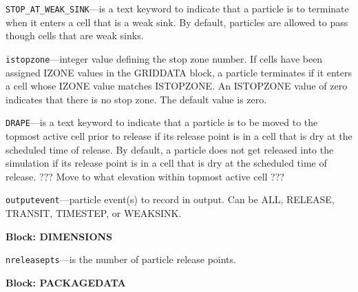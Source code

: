 \begin{description}
\item \texttt{STOP\_AT\_WEAK\_SINK}---is a text keyword to indicate that a particle is to terminate when it enters a cell that is a weak sink.  By default, particles are allowed to pass though cells that are weak sinks.

\item \texttt{istopzone}---integer value defining the stop zone number.  If cells have been assigned IZONE values in the GRIDDATA block, a particle terminates if it enters a cell whose IZONE value matches ISTOPZONE.  An ISTOPZONE value of zero indicates that there is no stop zone.  The default value is zero.

\item \texttt{DRAPE}---is a text keyword to indicate that a particle is to be moved to the topmost active cell prior to release if its release point is in a cell that is dry at the scheduled time of release.  By default, a particle does not get released into the simulation if its release point is in a cell that is dry at the scheduled time of release.  ??? Move to what elevation within topmost active cell ???

\item \texttt{outputevent}---particle event(s) to record in output.  Can be ALL, RELEASE, TRANSIT, TIMESTEP, or WEAKSINK.

\end{description}
\item \textbf{Block: DIMENSIONS}

\begin{description}
\item \texttt{nreleasepts}---is the number of particle release points.

\end{description}
\item \textbf{Block: PACKAGEDATA}

